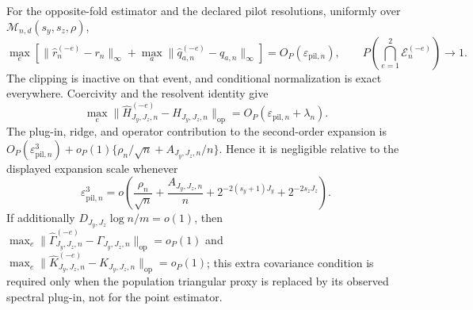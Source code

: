 For the opposite-fold estimator and the declared pilot resolutions, uniformly over \(\mathcal M_{n,d}(s_y,s_z,\rho)\),
\[
\max_e\left[\|\widehat r_n^{(-e)}-r_n\|_\infty+\max_a\|\widehat q_{a,n}^{(-e)}-q_{a,n}\|_\infty\right]=O_P(\varepsilon_{\mathrm{pil},n}),\qquad P\left(\bigcap_{e=1}^2\mathcal E_n^{(-e)}\right)\to1.
\]
The clipping is inactive on that event, and conditional normalization is exact everywhere. Coercivity and the resolvent identity give
\[
\max_e\|\widehat H_{J_y,J_z,n}^{(-e)}-H_{J_y,J_z,n}\|_{\mathrm{op}}=O_P(\varepsilon_{\mathrm{pil},n}+\lambda_n).
\]
The plug-in, ridge, and operator contribution to the second-order expansion is \(O_P(\varepsilon_{\mathrm{pil},n}^3)+o_P(1)\{\rho_n/\sqrt n+A_{J_y,J_z,n}/n\}\). Hence it is negligible relative to the displayed expansion scale whenever
\[
\varepsilon_{\mathrm{pil},n}^3=o\!\left(\frac{\rho_n}{\sqrt n}+\frac{A_{J_y,J_z,n}}n+2^{-2(s_y+1)J_y}+2^{-2s_zJ_z}\right).
\]
If additionally \(D_{J_y,J_z}\log n/m=o(1)\), then \(\max_e\|\widehat\Gamma_{J_y,J_z,n}^{(-e)}-\Gamma_{J_y,J_z,n}\|_{\mathrm{op}}=o_P(1)\) and \(\max_e\|\widehat K_{J_y,J_z,n}^{(-e)}-K_{J_y,J_z,n}\|_{\mathrm{op}}=o_P(1)\); this extra covariance condition is required only when the population triangular proxy is replaced by its observed spectral plug-in, not for the point estimator.